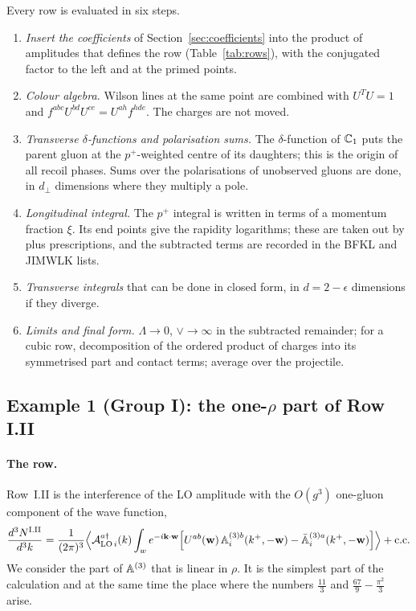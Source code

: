 Every row is evaluated in six steps.
\begin{enumerate}
\item \emph{Insert the coefficients} of Section~\ref{sec:coefficients} into the product of amplitudes that defines the row (Table~\ref{tab:rows}), with the conjugated factor to the left and at the primed points.
\item \emph{Colour algebra.} Wilson lines at the same point are combined with $U^TU=1$ and $f^{abc}U^{bd}U^{ce}=U^{ah}f^{hde}$. The charges are not moved.
\item \emph{Transverse $\delta$-functions and polarisation sums.} The $\delta$-function of $\mathbb{C}_1$ puts the parent gluon at the $p^+$-weighted centre of its daughters; this is the origin of all recoil phases. Sums over the polarisations of unobserved gluons are done, in $d_\perp$ dimensions where they multiply a pole.
\item \emph{Longitudinal integral.} The $p^+$ integral is written in terms of a momentum fraction $\xi$. Its end points give the rapidity logarithms; these are taken out by plus prescriptions, and the subtracted terms are recorded in the BFKL and JIMWLK lists.
\item \emph{Transverse integrals} that can be done in closed form, in $d=2-\epsilon$ dimensions if they diverge.
\item \emph{Limits and final form.} $\Lambda\to0$, $\vee\to\infty$ in the subtracted remainder; for a cubic row, decomposition of the ordered product of charges into its symmetrised part and contact terms; average over the projectile.
\end{enumerate}

\subsection{Example 1 (Group I): the one-\texorpdfstring{$\rho$}{rho} part of Row I.II}\label{sec:ex_I_II}

\paragraph{The row.} Row~I.II is the interference of the LO amplitude with the $O(g^3)$ one-gluon component of the wave function,
\begin{align}\label{eq:ex1_row}
\frac{d^3N^{\rm I.II}}{d^3k}=\frac{1}{(2\pi)^3}\Big\langle\mathcal A^{a\dagger}_{{\rm LO}\,i}(k)\int_we^{-i\mathbf{k}\cdot\mathbf{w}}\Big[U^{ab}(\mathbf{w})\,\mathbb{A}^{(3)b}_i(k^+,-\mathbf{w})-\bar{\mathbb{A}}^{(3)a}_i(k^+,-\mathbf{w})\Big]\Big\rangle+{\rm c.c.}
\end{align}
We consider the part of $\mathbb{A}^{(3)}$ that is linear in $\rho$. It is the simplest part of the calculation and at the same time the place where the numbers $\frac{11}{3}$ and $\frac{67}{9}-\frac{\pi^2}{3}$ arise.

